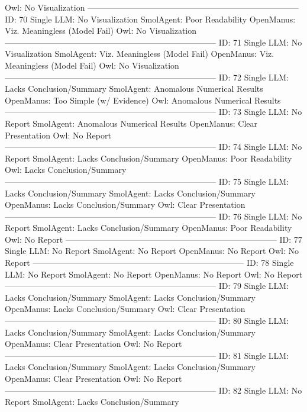 \begin{tcolorbox}[colback=cadmiumgreen!5!white,colframe=forestgreen!75!white,breakable,title=\textit{Human evaluation results in task 4.}]
\begin{VerbatimWrap}
Owl: No Visualization 
-----------------------------------------------------------------------------
ID: 70 
Single LLM: No Visualization 
SmolAgent: Poor Readability 
OpenManus: Viz. Meaningless (Model Fail) 
Owl: No Visualization 
-----------------------------------------------------------------------------
ID: 71 
Single LLM: No Visualization 
SmolAgent: Viz. Meaningless (Model Fail) 
OpenManus: Viz. Meaningless (Model Fail) 
Owl: No Visualization 
-----------------------------------------------------------------------------
ID: 72 
Single LLM: Lacks Conclusion/Summary 
SmolAgent: Anomalous Numerical Results 
OpenManus: Too Simple (w/ Evidence) 
Owl: Anomalous Numerical Results 
-----------------------------------------------------------------------------
ID: 73 
Single LLM: No Report 
SmolAgent: Anomalous Numerical Results 
OpenManus: Clear Presentation 
Owl: No Report 
-----------------------------------------------------------------------------
ID: 74 
Single LLM: No Report 
SmolAgent: Lacks Conclusion/Summary 
OpenManus: Poor Readability 
Owl: Lacks Conclusion/Summary 
-----------------------------------------------------------------------------
ID: 75 
Single LLM: Lacks Conclusion/Summary 
SmolAgent: Lacks Conclusion/Summary 
OpenManus: Lacks Conclusion/Summary 
Owl: Clear Presentation 
-----------------------------------------------------------------------------
ID: 76 
Single LLM: No Report 
SmolAgent: Lacks Conclusion/Summary 
OpenManus: Poor Readability 
Owl: No Report 
-----------------------------------------------------------------------------
ID: 77 
Single LLM: No Report 
SmolAgent: No Report 
OpenManus: No Report 
Owl: No Report 
-----------------------------------------------------------------------------
ID: 78 
Single LLM: No Report 
SmolAgent: No Report 
OpenManus: No Report 
Owl: No Report 
-----------------------------------------------------------------------------
ID: 79 
Single LLM: Lacks Conclusion/Summary 
SmolAgent: Lacks Conclusion/Summary 
OpenManus: Lacks Conclusion/Summary 
Owl: Clear Presentation 
-----------------------------------------------------------------------------
ID: 80 
Single LLM: Lacks Conclusion/Summary 
SmolAgent: Lacks Conclusion/Summary 
OpenManus: Clear Presentation 
Owl: No Report 
-----------------------------------------------------------------------------
ID: 81 
Single LLM: Lacks Conclusion/Summary 
SmolAgent: Lacks Conclusion/Summary 
OpenManus: Clear Presentation 
Owl: No Report 
-----------------------------------------------------------------------------
ID: 82 
Single LLM: No Report 
SmolAgent: Lacks Conclusion/Summary 

\end{VerbatimWrap}
\end{tcolorbox}

